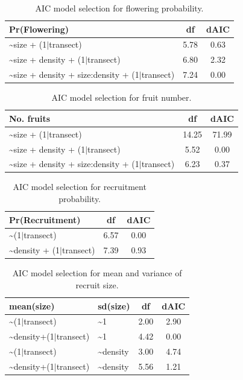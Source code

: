 \documentclass[11pt]{article}\usepackage[]{graphicx}\usepackage[usenames,dvipsnames]{xcolor}
\begin{document}
\begin{table}[ht]
\centering
\begin{tabular}{|p{8cm}|c|c|}
  \hline
Pr(Flowering) & df & dAIC \\ 
  \hline
\~{}size + (1$|$transect) & 5.78 & 0.63 \\ 
  \~{}size + density + (1$|$transect) & 6.80 & 2.32 \\ 
  \~{}size + density + size:density + (1$|$transect) & 7.24 & 0.00 \\ 
   \hline
\end{tabular}
\caption{AIC model selection for flowering probability.} 
\label{tab:flow_aic}
\end{table}



\begin{table}[ht]
\centering
\begin{tabular}{|p{8cm}|c|c|}
  \hline
No. fruits & df & dAIC \\ 
  \hline
\~{}size + (1$|$transect) & 14.25 & 71.99 \\ 
  \~{}size + density + (1$|$transect) & 5.52 & 0.00 \\ 
  \~{}size + density + size:density + (1$|$transect) & 6.23 & 0.37 \\ 
   \hline
\end{tabular}
\caption{AIC model selection for fruit number.} 
\label{tab:fruit_aic}
\end{table}


\begin{table}[ht]
\centering
\begin{tabular}{|p{8cm}|c|c|}
  \hline
Pr(Recruitment) & df & dAIC \\ 
  \hline
\~{}(1$|$transect) & 6.57 & 0.00 \\ 
  \~{}density + (1$|$transect) & 7.39 & 0.93 \\ 
   \hline
\end{tabular}
\caption{AIC model selection for recruitment probability.} 
\label{tab:recruit_aic}
\end{table}


\begin{table}[ht]
\centering
\begin{tabular}{|p{8cm}|p{4cm}|c|c|}
  \hline
mean(size) & sd(size) & df & dAIC \\ 
  \hline
\~{}(1$|$transect) & \~{}1 & 2.00 & 2.90 \\ 
  \~{}density+(1$|$transect) & \~{}1 & 4.42 & 0.00 \\ 
  \~{}(1$|$transect) & \~{}density & 3.00 & 4.74 \\ 
  \~{}density+(1$|$transect) & \~{}density & 5.56 & 1.21 \\ 
   \hline
\end{tabular}
\caption{AIC model selection for mean and variance of recruit size.} 
\label{tab:recruitsize_aic}
\end{table}
\end{document}
